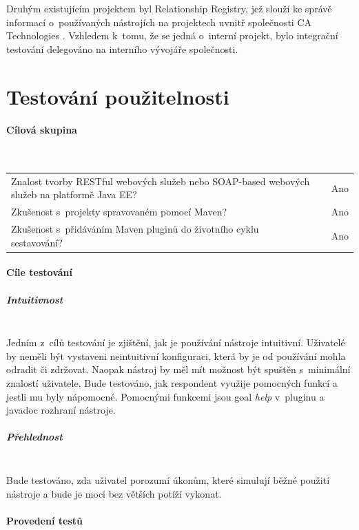 \documentclass[11pt,twoside,a4paper]{book}
\begin{document}
Druhým existujícím projektem byl Relationship Registry, jež slouží ke správě
informací o~používaných nástrojích na projektech uvnitř společnosti CA
Technologies \cite{CAHome}. Vzhledem k~tomu, že se jedná o~interní projekt, bylo
integrační testování delegováno na interního vývojáře společnosti.

\section{Testování použitelnosti}

\paragraph{Cílová skupina}
\mbox{}\\

\begin{tabular}{m{10cm} m{1cm} m{3cm}}
Znalost tvorby RESTful webových služeb nebo SOAP-based webových služeb na
platformě Java EE? & & Ano \\
Zkušenost s~projekty spravovaném pomocí Maven? & & Ano \\
Zkušenost s~přidáváním Maven pluginů do životního cyklu sestavování? & & Ano \\
\end{tabular}

\paragraph{Cíle testování}

\subparagraph{Intuitivnost}
\mbox{}\\

Jedním z~cílů testování je zjištění, jak je používání nástroje intuitivní.
Uživatelé by neměli být vystaveni neintuitivní konfiguraci, která by je od
používání mohla odradit či zdržovat. Naopak nástroj by měl mít možnost být
spuštěn s~minimální znalostí uživatele. Bude testováno, jak respondent
využije pomocných funkcí a jestli mu byly nápomocné.
Pomocnými funkcemi jsou goal {\em help} v~pluginu a javadoc rozhraní nástroje.

\subparagraph{Přehlednost}
\mbox{}\\

Bude testováno, zda uživatel porozumí úkonům, které simulují běžné použití
nástroje a bude je moci bez větších potíží vykonat.

\paragraph{Provedení testů}
\mbox{}\\
\end{document}
